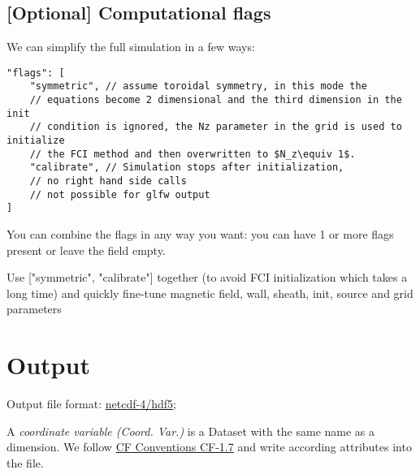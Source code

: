 \subsection{[Optional] Computational flags}
We can simplify the full simulation in a few ways:
\begin{verbatim}
"flags": [
    "symmetric", // assume toroidal symmetry, in this mode the
    // equations become 2 dimensional and the third dimension in the init
    // condition is ignored, the Nz parameter in the grid is used to initialize
    // the FCI method and then overwritten to $N_z\equiv 1$.
    "calibrate", // Simulation stops after initialization,
    // no right hand side calls
    // not possible for glfw output
]
\end{verbatim}
You can combine the flags in any way you want: you can have 1 or more
flags present or leave the field empty.
\begin{tcolorbox}[title=Note]
    Use ["symmetric", "calibrate"] together (to avoid FCI initialization
    which takes a long time) and quickly fine-tune
    magnetic field, wall, sheath, init, source and grid parameters
\end{tcolorbox}

\section{Output} \label{sec:output_file}
Output file format: \href{https://www.unidata.ucar.edu/software/netcdf/docs/}{netcdf-4/hdf5};

A \textit{coordinate variable (Coord. Var.)} is a Dataset with the same name as a dimension.
We follow
\href{http://cfconventions.org/Data/cf-conventions/cf-conventions-1.7/cf-conventions.html}{CF Conventions CF-1.7}
and write according attributes into the file.

